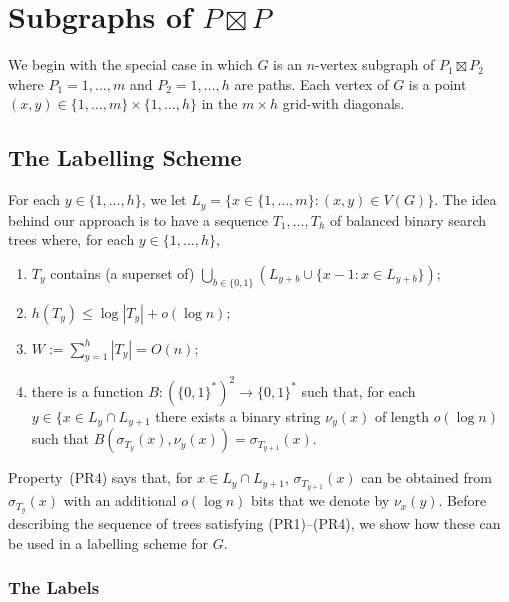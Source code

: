 \documentclass[kpfonts]{patmorin}
\newcommand{\pnote}[1]{\ \newline\noindent\fcolorbox{red}{yellow}{\begin{minipage}{\textwidth}#1\end{minipage}}}
\begin{document}
\section{Subgraphs of $P\boxtimes P$}

We begin with the special case in which $G$ is an $n$-vertex subgraph of $P_1\boxtimes P_2$ where $P_1=1,\ldots,m$ and $P_2=1,\ldots,h$ are paths. Each vertex of $G$ is a point $(x,y)\in\{1,\ldots,m\}\times \{1,\ldots,h\}$ in the $m\times h$ grid-with diagonals.  


\subsection{The Labelling Scheme}

For each $y\in\{1,\ldots,h\}$, we let $L_y=\{x\in\{1,\ldots,m\}:(x,y)\in V(G)\}$.  The idea behind our approach is to have a sequence $T_1,\ldots,T_h$ of balanced binary search trees where, for each $y\in\{1,\ldots,h\}$,
\begin{enumerate}[(PR1)]
  \item $T_y$ contains (a superset of) $\bigcup_{b\in\{0,1\}} (L_{y+b}\cup \{x-1:x\in L_{y+b}\})$;
  
  \item $h(T_y)\le\log |T_y| + o(\log n)$;
  
  \item $W:=\sum_{y=1}^h |T_y| = O(n)$;
  
  \item there is a function $B:(\{0,1\}^*)^2\to\{0,1\}^*$ such that, for each $y\in\{x\in L_y\cap L_{y+1}$ there exists a binary string $\nu_y(x)$ of length $o(\log n)$ such that $B(\sigma_{T_{y}}(x), \nu_y(x))=\sigma_{T_{y+1}}(x)$.
\end{enumerate}

Property~(PR4) says that, for $x\in L_y\cap L_{y+1}$, $\sigma_{T_{y+1}}(x)$ can be obtained from $\sigma_{T_{y}}(x)$ with an additional $o(\log n)$ bits that we denote by $\nu_x(y)$.  Before describing the sequence of trees satisfying (PR1)--(PR4), we show how these can be used in a labelling scheme for $G$. 


\subsubsection{The Labels}
\end{document}
